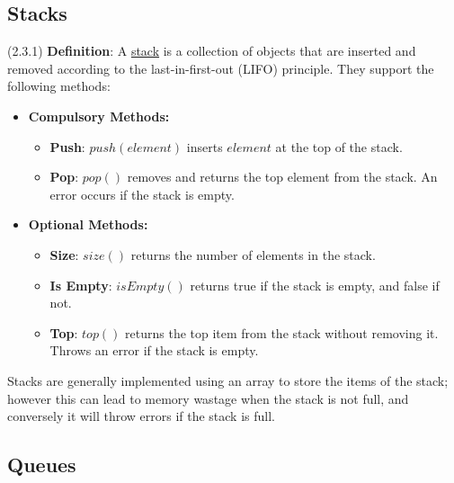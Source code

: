 \documentclass{article}
\newcommand{\definition}[2]{(#1) \textbf{Definition}: #2}
\begin{document}
\subsection{Stacks}

\definition{2.3.1}{A \underline{stack} is a collection of objects that are inserted and removed according to the last-in-first-out (LIFO) principle.} They support the following methods:
\begin{itemize}
    \item \textbf{Compulsory Methods:}
    \begin{itemize}
        \item \textbf{Push}: \(push(element)\) inserts \(element\) at the top of the stack.
        \item \textbf{Pop}: \(pop()\) removes and returns the top element from the stack. An error occurs if the stack is empty.
    \end{itemize}
    \item \textbf{Optional Methods:}
    \begin{itemize}
        \item \textbf{Size}: \(size()\) returns the number of elements in the stack.
        \item \textbf{Is Empty}: \(isEmpty()\) returns true if the stack is empty, and false if not.
        \item \textbf{Top}: \(top()\) returns the top item from the stack without removing it. Throws an error if the stack is empty.
    \end{itemize}
\end{itemize}
Stacks are generally implemented using an array to store the items of the stack; however this can lead to memory wastage when the stack is not full, and conversely it will throw errors if the stack is full.

\newpage\subsection{Queues}
\end{document}
